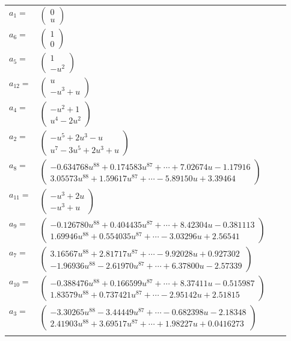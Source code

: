 \documentclass[1p]{elsarticle_modified}
\theoremstyle{definition}
\begin{document}
\begin{tabular}{m{7pt} m{180pt} m{7pt} m{180pt} }
\flushright $a_{1}=$&$\begin{pmatrix}0\\u\end{pmatrix}$ \\
\flushright $a_{6}=$&$\begin{pmatrix}1\\0\end{pmatrix}$ \\
\flushright $a_{5}=$&$\begin{pmatrix}1\\- u^2\end{pmatrix}$ \\
\flushright $a_{12}=$&$\begin{pmatrix}u\\- u^3+u\end{pmatrix}$ \\
\flushright $a_{4}=$&$\begin{pmatrix}- u^2+1\\u^4-2 u^2\end{pmatrix}$ \\
\flushright $a_{2}=$&$\begin{pmatrix}- u^5+2 u^3- u\\u^7-3 u^5+2 u^3+u\end{pmatrix}$ \\
\flushright $a_{8}=$&$\begin{pmatrix}-0.634768 u^{88}+0.174583 u^{87}+\cdots+7.02674 u-1.17916\\3.05573 u^{88}+1.59617 u^{87}+\cdots-5.89150 u+3.39464\end{pmatrix}$ \\
\flushright $a_{11}=$&$\begin{pmatrix}- u^3+2 u\\- u^3+u\end{pmatrix}$ \\
\flushright $a_{9}=$&$\begin{pmatrix}-0.126780 u^{88}+0.404435 u^{87}+\cdots+8.42304 u-0.381113\\1.69946 u^{88}+0.554035 u^{87}+\cdots-3.03296 u+2.56541\end{pmatrix}$ \\
\flushright $a_{7}=$&$\begin{pmatrix}3.16567 u^{88}+2.81717 u^{87}+\cdots-9.92028 u+0.927302\\-1.96936 u^{88}-2.61970 u^{87}+\cdots+6.37800 u-2.57339\end{pmatrix}$ \\
\flushright $a_{10}=$&$\begin{pmatrix}-0.388476 u^{88}+0.166599 u^{87}+\cdots+8.37411 u-0.515987\\1.83579 u^{88}+0.737421 u^{87}+\cdots-2.95142 u+2.51815\end{pmatrix}$ \\
\flushright $a_{3}=$&$\begin{pmatrix}-3.30265 u^{88}-3.44449 u^{87}+\cdots-0.682398 u-2.18348\\2.41903 u^{88}+3.69517 u^{87}+\cdots+1.98227 u+0.0416273\end{pmatrix}$\\&\end{tabular}
\end{document}
